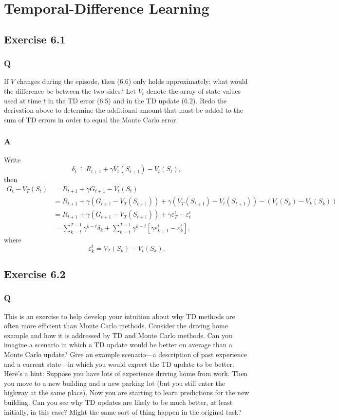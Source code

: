 \section{Temporal-Difference Learning}

\subsection{Exercise 6.1}
\subsubsection{Q}
If $V$ changes during the episode, then (6.6) only holds approximately; what would the difference be between the two sides? Let $V_t$ denote the array of state values used at time $t$ in the TD error (6.5) and in the TD update (6.2). Redo the derivation above to determine the additional amount that must be added to the sum of TD errors in order to equal the Monte Carlo error.
\subsubsection{A}
Write
\[
    \delta_t \doteq R_{t+1}+ \gamma V_t(S_{t+1}) - V_t(S_t),
\]
then
\begin{align}
    G_t - V_T(S_t) &= R_{t+1} + \gamma G_{t+1} - V_t(S_t) \\
                   &= R_{t+1} + \gamma (G_{t+1} - V_T(S_{t+1})) + \gamma (V_T(S_{t+1}) - V_t(S_{t+1})) - (V_t(S_k) - V_k(S_k)) \\
                   &= R_{t+1} + \gamma (G_{t+1} - V_T(S_{t+1})) + \gamma\varepsilon^t_T - \varepsilon_t^t \\
                   &= \sum_{k=t}^{T-1} \gamma^{k-t} \delta_k + \sum_{k=t}^{T-1} \gamma^{k-t} [\gamma \varepsilon_{k+1}^t - \varepsilon_k^t],
\end{align}
where 
\[
    \varepsilon_k^t \doteq V_T(S_k) - V_t(S_k).
\]
                   
\subsection{Exercise 6.2}
\subsubsection{Q}
This is an exercise to help develop your intuition about why TD methods are often more efficient than Monte Carlo methods. Consider the driving home example and how it is addressed by TD and Monte Carlo methods. Can you imagine a scenario in which a TD update would be better on average than a Monte Carlo update? Give an example scenario—a description of past experience and a current state—in which you would expect the TD update to be better. Here’s a hint: Suppose you have lots of experience driving home from work. Then you move to a new building and a new parking lot (but you still enter the highway at the same place). Now you are starting to learn predictions for the new building. Can you see why TD updates are likely to be much better, at least initially, in this case? Might the same sort of thing happen in the original task?
